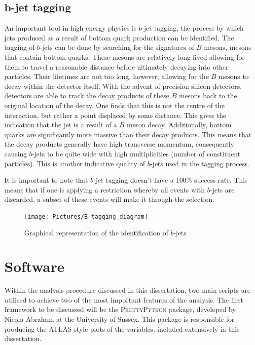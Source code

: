 \subsection{b-jet tagging} \label{subsec:bjetTag}
An important tool in high energy physics is $b$-jet tagging, the process by which jets produced as a result of bottom quark production can be identified.
The tagging of $b$-jets can be done by searching for the signatures of $B$ mesons, mesons that contain bottom quarks.
These mesons are relatively long-lived allowing for them to travel a reasonable distance before ultimately decaying into other particles.
Their lifetimes are not too long, however, allowing for the $B$ mesons to decay within the detector itself. 
With the advent of precision silicon detectors, detectors are able to track the decay products of these $B$ mesons back to the original location of the decay.
One finds that this is not the centre of the interaction, but rather a point displaced by some distance. 
This gives the indication that the jet is a result of a $B$ meson decay.
Additionally, bottom quarks are significantly more massive than their decay products. 
This means that the decay products generally have high transverse momentum, consequently causing $b$-jets to be quite wide with high multiplicities (number of constituent particles).
This is another indicative quality of $b$-jets used in the tagging process.

It is important to note that $b$-jet tagging doesn't have a 100\% success rate.
This means that if one is applying a restriction whereby all events with $b$-jets are discarded, a subset of these events will make it through the selection.

\begin{figure}[H] %
   \centering
   \texttt{[image: Pictures/B-tagging\_diagram]} 
   \caption{Graphical representation of the identification of $b$-jets}
   \label{fig:bjetTagging}
\end{figure}

\section{Software}
Within the analysis procedure discussed in this dissertation, two main scripts are utilised to achieve two of the most important features of the analysis.
The first framework to be discussed will be the P{\scshape rettyPython} package, developed by Nicola Abraham at the University of Sussex.
This package is responsible for producing the ATLAS style plots of the variables, included extensively in this dissertation.

